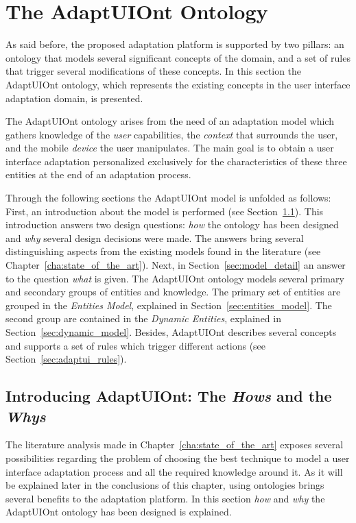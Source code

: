 \section{The AdaptUIOnt Ontology}
\label{sec:adaptui_model}

As said before, the proposed adaptation platform is supported by two pillars: an 
ontology that models several significant concepts of the domain, and a set of 
rules that trigger several modifications of these concepts. In this section the
AdaptUIOnt ontology, which represents the existing concepts in the user interface 
adaptation domain, is presented.
  
The AdaptUIOnt ontology arises from the need of an adaptation model which gathers
knowledge of the \textit{user} capabilities, the \textit{context} that surrounds
the user, and the mobile \textit{device} the user manipulates. The main goal
is to obtain a user interface adaptation personalized exclusively for the
characteristics of these three entities at the end of an adaptation process.

Through the following sections the AdaptUIOnt model is unfolded as follows: 
First, an introduction about the model is performed (see Section~\ref{sec:model_introduction}).
This introduction answers two design questions: \textit{how} the ontology has
been designed and \textit{why} several design decisions were made. The answers
bring several distinguishing aspects from the existing models found in the
literature (see Chapter~\ref{cha:state_of_the_art}). Next, in Section~\ref{sec:model_detail}
an answer to the question \textit{what} is given. The AdaptUIOnt ontology models
several primary and secondary groups of entities and knowledge. The primary
set of entities are grouped in the \textit{Entities Model}, explained in
Section~\ref{sec:entities_model}. The second group are contained in the
\textit{Dynamic Entities}, explained in Section~\ref{sec:dynamic_model}. Besides,
AdaptUIOnt describes several concepts and supports a set of rules which trigger
different actions (see Section~\ref{sec:adaptui_rules}).


\subsection{Introducing AdaptUIOnt: The \textit{Hows} and the \textit{Whys}}
\label{sec:model_introduction}

The literature analysis made in Chapter~\ref{cha:state_of_the_art} exposes
several possibilities regarding the problem of choosing the best technique
to model a user interface adaptation process and all the required knowledge
around it. As it will be explained later in the conclusions of this chapter, 
using ontologies brings several benefits to the adaptation platform. In this 
section \textit{how} and \textit{why} the AdaptUIOnt ontology has been designed
is explained.

